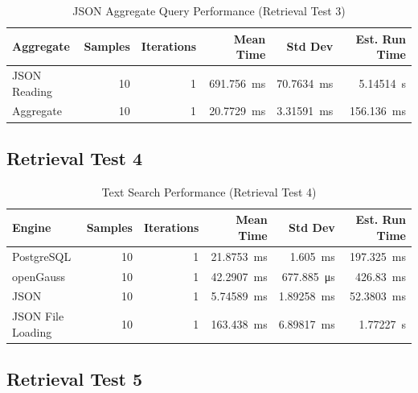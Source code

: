 \documentclass[14pt,a4paper]{article}
\begin{document}
    \begin{table}[H]
        \centering        
        \begin{tabular}{lrrrrr}
            \toprule
            \textbf{Aggregate} & \textbf{Samples} & \textbf{Iterations} & \textbf{Mean Time} & \textbf{Std Dev} & \textbf{Est. Run Time} \\
            \midrule
            JSON Reading & 10 & 1 & \qty{691.756}{\milli\second} & \qty{70.7634}{\milli\second} & \qty{5.14514}{\second} \\
            Aggregate & 10 & 1 & \qty{20.7729}{\milli\second} & \qty{3.31591}{\milli\second} & \qty{156.136}{\milli\second} \\
            \bottomrule
        \end{tabular}
        \caption{JSON Aggregate Query Performance (Retrieval Test 3)}
    \end{table}
    
    \subsection{Retrieval Test 4}
    
    \begin{table}[H]
        \centering        
        \begin{tabular}{lrrrrr}
            \toprule
            \textbf{Engine} & \textbf{Samples} & \textbf{Iterations} & \textbf{Mean Time} & \textbf{Std Dev} & \textbf{Est. Run Time} \\
            \midrule
            PostgreSQL & 10 & 1 & \qty{21.8753}{\milli\second} & \qty{1.605}{\milli\second} & \qty{197.325}{\milli\second} \\
            openGauss & 10 & 1 & \qty{42.2907}{\milli\second} & \qty{677.885}{\micro\second} & \qty{426.83}{\milli\second} \\
            JSON & 10 & 1 & \qty{5.74589}{\milli\second} & \qty{1.89258}{\milli\second} & \qty{52.3803}{\milli\second} \\
            JSON File Loading & 10 & 1 & \qty{163.438}{\milli\second} & \qty{6.89817}{\milli\second} & \qty{1.77227}{\second} \\
            \bottomrule
        \end{tabular}
        \caption{Text Search Performance (Retrieval Test 4)}
    \end{table}
    
    \subsection{Retrieval Test 5}
    
\end{document}

